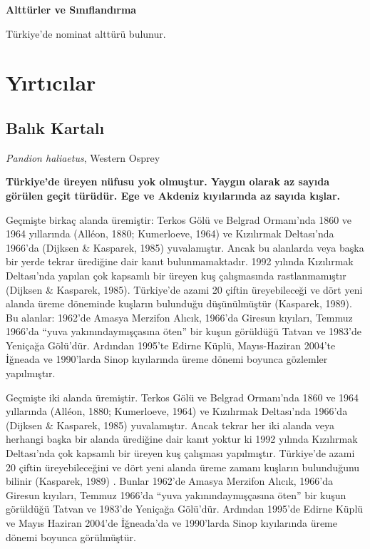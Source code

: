 \documentclass[
  a4paper,
  DIV=11,
  numbers=noendperiod]{scrreprt}
\begin{document}
\textbf{Alttürler ve Sınıflandırma}

Türkiye'de nominat alttürü bulunur.


\chapter{Yırtıcılar}\label{yux131rtux131cux131lar}

\section{Balık Kartalı}\label{balux131k-kartalux131}

\emph{Pandion haliaetus}, Western Osprey

\textbf{Türkiye'de üreyen nüfusu yok olmuştur. Yaygın olarak az sayıda
görülen geçit türüdür. Ege ve Akdeniz kıyılarında az sayıda kışlar.}

Geçmişte birkaç alanda üremiştir: Terkos Gölü ve Belgrad Ormanı'nda 1860
ve 1964 yıllarında (Alléon, 1880; Kumerloeve, 1964) ve Kızılırmak
Deltası'nda 1966'da (Dijksen \& Kasparek, 1985) yuvalamıştır. Ancak bu
alanlarda veya başka bir yerde tekrar ürediğine dair kanıt
bulunmamaktadır. 1992 yılında Kızılırmak Deltası'nda yapılan çok
kapsamlı bir üreyen kuş çalışmasında rastlanmamıştır (Dijksen \&
Kasparek, 1985). Türkiye'de azami 20 çiftin üreyebileceği ve dört yeni
alanda üreme döneminde kuşların bulunduğu düşünülmüştür (Kasparek,
1989). Bu alanlar: 1962'de Amasya Merzifon Alıcık, 1966'da Giresun
kıyıları, Temmuz 1966'da ``yuva yakınındaymışçasına öten'' bir kuşun
görüldüğü Tatvan ve 1983'de Yeniçağa Gölü'dür. Ardından 1995'te Edirne
Küplü, Mayıs-Haziran 2004'te İğneada ve 1990'larda Sinop kıyılarında
üreme dönemi boyunca gözlemler yapılmıştır.

Geçmişte iki alanda üremiştir. Terkos Gölü ve Belgrad Ormanı'nda 1860 ve
1964 yıllarında (Alléon, 1880; Kumerloeve, 1964) ve Kızılırmak
Deltası'nda 1966'da (Dijksen \& Kasparek, 1985) yuvalamıştır. Ancak
tekrar her iki alanda veya herhangi başka bir alanda ürediğine dair
kanıt yoktur ki 1992 yılında Kızılırmak Deltası'nda çok kapsamlı bir
üreyen kuş çalışması yapılmıştır. Türkiye'de azami 20 çiftin
üreyebileceğini ve dört yeni alanda üreme zamanı kuşların bulunduğunu
bilinir (Kasparek, 1989) . Bunlar 1962'de Amasya Merzifon Alıcık,
1966'da Giresun kıyıları, Temmuz 1966'da ``yuva yakınındaymışçasına
öten'' bir kuşun görüldüğü Tatvan ve 1983'de Yeniçağa Gölü'dür. Ardından
1995'de Edirne Küplü ve Mayıs Haziran 2004'de İğneada'da ve 1990'larda
Sinop kıyılarında üreme dönemi boyunca görülmüştür.
\end{document}
